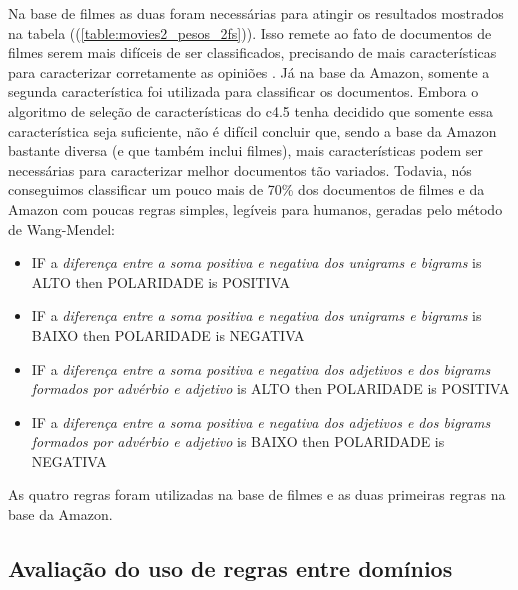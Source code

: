Na base de filmes as duas foram necessárias para atingir os resultados mostrados na tabela ((\ref{table:movies2_pesos_2fs})). Isso remete ao fato de documentos de filmes serem mais difíceis de ser classificados, precisando de mais características para caracterizar corretamente as opiniões \cite{turney2002thumbs, pang2004sentimental, chaovalit2005movie, ohana2009sentiment}. Já na base da Amazon, somente a segunda característica foi utilizada para classificar os documentos. Embora o algoritmo de seleção de características do c4.5 tenha decidido que somente essa característica seja suficiente, não é difícil concluir que, sendo a base da Amazon bastante diversa (e que também inclui filmes), mais características podem ser necessárias para caracterizar melhor documentos tão variados.
Todavia, nós conseguimos classificar um pouco mais de 70\% dos documentos de filmes e da Amazon com poucas regras simples, legíveis para humanos, geradas pelo método de Wang-Mendel:

\begin{itemize}
\item IF a \textit{diferença entre a soma positiva e negativa dos unigrams e bigrams} is ALTO then POLARIDADE is POSITIVA
\item IF a \textit{diferença entre a soma positiva e negativa dos unigrams e bigrams} is BAIXO then POLARIDADE is NEGATIVA
\item IF a \textit{diferença entre a soma positiva e negativa dos adjetivos e dos bigrams formados por advérbio e adjetivo} is ALTO then POLARIDADE is POSITIVA
\item IF a \textit{diferença entre a soma positiva e negativa dos adjetivos e dos bigrams formados por advérbio e adjetivo} is BAIXO then POLARIDADE is NEGATIVA
\end{itemize}

As quatro regras foram utilizadas na base de filmes e as duas primeiras regras na base da Amazon.

\subsection{Avaliação do uso de regras entre domínios}


